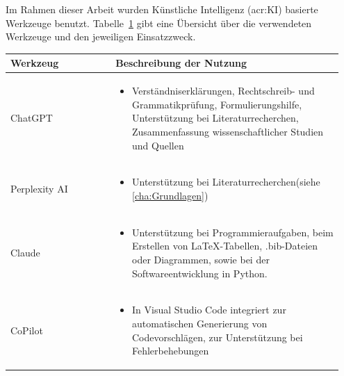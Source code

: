 \setcounter{chapter}{1}

Im Rahmen dieser Arbeit wurden Künstliche Intelligenz (\acrshort{acr:KI}) basierte Werkzeuge benutzt. Tabelle~\ref{tab:anhang_uebersicht_KI_werkzeuge} gibt eine Übersicht über die verwendeten Werkzeuge und den jeweiligen Einsatzzweck.


\begin{table}[hbt]	
	\centering
	\renewcommand{\arraystretch}{1.5}	%
	\label{tab:anhang_uebersicht_KI_werkzeuge}
	\begin{tabular}{>{\raggedright\arraybackslash}p{0.3\linewidth} >{\raggedright\arraybackslash}p{0.65\linewidth}}
		\textbf{Werkzeug} & \textbf{Beschreibung der Nutzung}\\
		\hline
		\hline
		ChatGPT & 
		\vspace{-\topsep}
		\begin{itemize}[noitemsep,topsep=0pt,partopsep=0pt,parsep=0pt]
			\item Verständniserklärungen, Rechtschreib- und Grammatikprüfung, Formulierungshilfe, Unterstützung bei Literaturrecherchen, Zusammenfassung wissenschaftlicher Studien und Quellen
		\end{itemize} \\
		Perplexity AI &
		\vspace{-\topsep}
		\begin{itemize}[noitemsep,topsep=0pt,partopsep=0pt,parsep=0pt]
			\item Unterstützung bei Literaturrecherchen(siehe \autoref{cha:Grundlagen})
		\end{itemize} \\
		Claude &
		\vspace{-\topsep}
		\begin{itemize}[noitemsep,topsep=0pt,partopsep=0pt,parsep=0pt]
			\item Unterstützung bei Programmieraufgaben, beim Erstellen von LaTeX-Tabellen, .bib-Dateien oder Diagrammen, sowie bei der Softwareentwicklung in Python.
		\end{itemize} \\
		CoPilot &
		\vspace{-\topsep}
		\begin{itemize}[noitemsep,topsep=0pt,partopsep=0pt,parsep=0pt]
			\item In Visual Studio Code integriert zur automatischen Generierung von Codevorschlägen, zur Unterstützung bei Fehlerbehebungen

\end{itemize}
\end{tabular}
\end{table}
